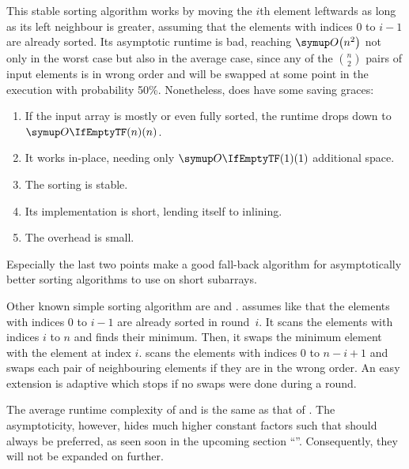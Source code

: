 \section{\texorpdfstring{\IS{}}{InsertionSort}}
\label{sec:tasklet:insertion}

This stable sorting algorithm works by moving the \(i\)th element leftwards as long as its left neighbour is greater, assuming that the elements with indices \(0\) to \(i - 1\) are already sorted.
Its asymptotic runtime is bad, reaching \(\bigoh*{n^2}\) not only in the worst case but also in the average case, since any of the \(\binom{n}{2}\) pairs of input elements is in wrong order and will be swapped at some point in the execution with probability 50\%.
Nonetheless, \IS{} does have some saving graces:
\begin{enumerate}
	\item
	If the input array is mostly or even fully sorted, the runtime drops down to \(\bigoh{n}\).

	\item
	It works in-place, needing only \(\bigoh{1}\) additional space.

	\item
	The sorting is stable.

	\item
	Its implementation is short, lending itself to inlining.

	\item
	The overhead is small.
\end{enumerate}
Especially the last two points make \IS{} a good fall-back algorithm for asymptotically better sorting algorithms to use on short subarrays.

\begin{note}
	Other known simple sorting algorithm are \SelS{} and \BS{}.
	\emph{\SelS{}} assumes like \IS{} that the elements with indices \(0\) to \(i - 1\) are already sorted in round~\(i\).
	It scans the elements with indices \(i\) to \(n\) and finds their minimum.
	Then, it swaps the minimum element with the element at index \(i\).
	\emph{\BS{}} scans the elements with indices \(0\) to \(n - i + 1\) and swaps each pair of neighbouring elements if they are in the wrong order.
	An easy extension is adaptive \BS{} which stops if no swaps were done during a round.

	The average runtime complexity of \SelS{} and \BS{} is the same as that of \IS{}.
	The asymptoticity, however, hides much higher constant factors such that \IS{} should always be preferred, as seen soon in the upcoming section \enquote{}.
	Consequently, they will not be expanded on further.
\end{note}

